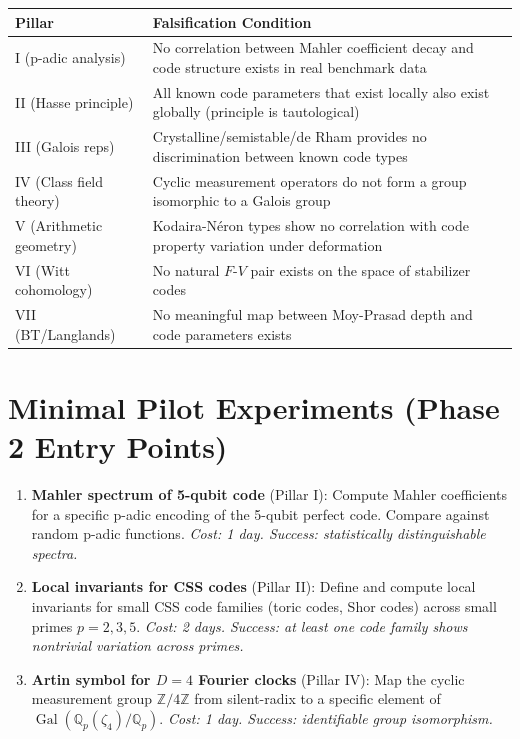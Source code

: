\documentclass[12pt]{article}
\theoremstyle{remark}
\begin{document}
\begin{center}
\begin{tabular}{|l|p{8cm}|}
\hline
\textbf{Pillar} & \textbf{Falsification Condition} \\
\hline
I (p-adic analysis) & No correlation between Mahler coefficient decay
  and code structure exists in real benchmark data \\
\hline
II (Hasse principle) & All known code parameters that exist locally also
  exist globally (principle is tautological) \\
\hline
III (Galois reps) & Crystalline/semistable/de Rham provides no
  discrimination between known code types \\
\hline
IV (Class field theory) & Cyclic measurement operators do not form a
  group isomorphic to a Galois group \\
\hline
V (Arithmetic geometry) & Kodaira-N\'eron types show no correlation with
  code property variation under deformation \\
\hline
VI (Witt cohomology) & No natural $F$-$V$ pair exists on the space of
  stabilizer codes \\
\hline
VII (BT/Langlands) & No meaningful map between Moy-Prasad depth and
  code parameters exists \\
\hline
\end{tabular}
\end{center}

\section{Minimal Pilot Experiments (Phase 2 Entry Points)}

\begin{enumerate}
\item \textbf{Mahler spectrum of 5-qubit code} (Pillar I):
  Compute Mahler coefficients for a specific p-adic encoding of the
  5-qubit perfect code. Compare against random p-adic functions.
  \textit{Cost: 1 day. Success: statistically distinguishable spectra.}

\item \textbf{Local invariants for CSS codes} (Pillar II):
  Define and compute local invariants for small CSS code families
  (toric codes, Shor codes) across small primes $p = 2, 3, 5$.
  \textit{Cost: 2 days. Success: at least one code family shows
  nontrivial variation across primes.}

\item \textbf{Artin symbol for $D=4$ Fourier clocks} (Pillar IV):
  Map the cyclic measurement group $\mathbb{Z}/4\mathbb{Z}$ from
  silent-radix to a specific element of
  $\operatorname{Gal}(\mathbb{Q}_p(\zeta_4)/\mathbb{Q}_p)$.
  \textit{Cost: 1 day. Success: identifiable group isomorphism.}
\end{enumerate}
\end{document}
